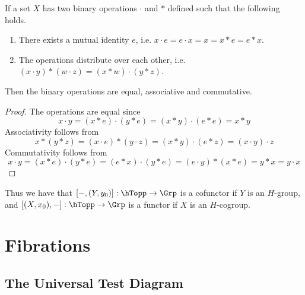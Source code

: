 \begin{lem}
\label{Eckmann-Hilton Principle}
\label{set with two binary operations}
If a set $X$ has two binary operations $\cdot$ and $*$ defined such that the following holds.
\begin{enumerate}
	\item There exists a mutual identity $e$, i.e. $x \cdot e = e \cdot x = x = x * e = e * x$.
	\item The operations distribute over each other, i.e. $(x \cdot y) * (w \cdot z) = (x * w) \cdot (y * z)$.
\end{enumerate}
Then the binary operations are equal, associative and commutative.
\end{lem}
\begin{proof}
The operations are equal since
\[ x \cdot y = (x * e) \cdot (y * e) = (x * y) \cdot (e * e) = x * y \]
Associativity follows from
\[ x * (y * z) = (x \cdot e) * (y \cdot z) = (x * y) \cdot (e * z) = (x \cdot y) \cdot z \]
Commutativity follows from
\[ x \cdot y = (x * e) \cdot (y * e) = (e * x) \cdot (y * e) = (e \cdot y) * (x * e) = y * x = y \cdot x \]
\end{proof}

Thus we have that $[-,(Y,y_0)] : \hTopp \rightarrow \Grp$ is a cofunctor if $Y$ is an $H$-group, and $[(X,x_0),-] : \hTopp \rightarrow \Grp$ is a functor if $X$ is an $H$-cogroup. 






\newpage
\section{Fibrations}

\subsection{The Universal Test Diagram}

